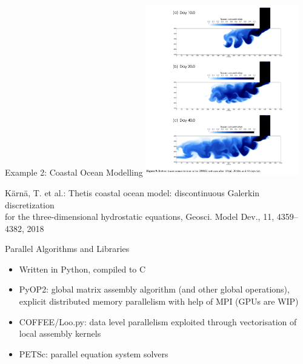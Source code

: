 \documentclass[presentation]{beamer}
\begin{document}
\begin{frame}{Example 2: Coastal Ocean Modelling}
\centering
\includegraphics[width=0.5\textwidth]{figures/plume.png}


\vspace{0.3cm}
{\tiny Kärnä, T. et al.: Thetis coastal ocean model: discontinuous Galerkin discretization\\
\vspace{-\baselineskip}for the three-dimensional hydrostatic equations, Geosci. Model Dev., 11, 4359–4382, 2018}
\end{frame}


\begin{frame}{Parallel Algorithms and Libraries}
    \begin{itemize}
        \item Written in Python, compiled to C
        \item PyOP2: global matrix assembly algorithm (and other global operations), explicit distributed memory parallelism with help of MPI (GPUs are WIP)
        \item COFFEE/Loo.py: data level parallelism exploited through vectorisation of local assembly kernels
        \item PETSc: parallel equation system solvers
    \end{itemize}
\end{frame}
\end{document}
